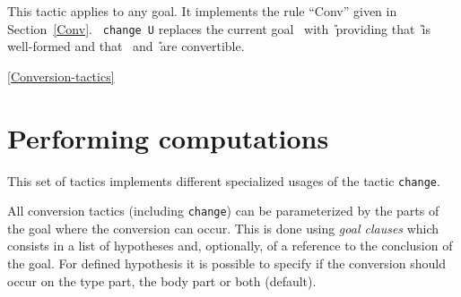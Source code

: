 \begin{coq_example*}
This tactic applies to any goal. It implements the rule
``Conv'' given in Section~\ref{Conv}.  {\tt
  change U} replaces the current goal \T\ with \U\ providing that
\U\ is well-formed and that \T\ and \U\ are convertible.

\begin{ErrMsgs}
\item {}
\end{ErrMsgs}


\SeeAlso \ref{Conversion-tactics}


\section{Performing computations
\label{Conversion-tactics}}

This set of tactics implements different specialized usages of the
tactic \texttt{change}.

All conversion tactics (including \texttt{change}) can be
parameterized by the parts of the goal where the conversion can
occur. This is done using \emph{goal clauses} which consists in a list
of hypotheses and, optionally, of a reference to the conclusion of the
goal. For defined hypothesis it is possible to specify if the
conversion should occur on the type part, the body part or both
(default).


\end{coq_example*}
